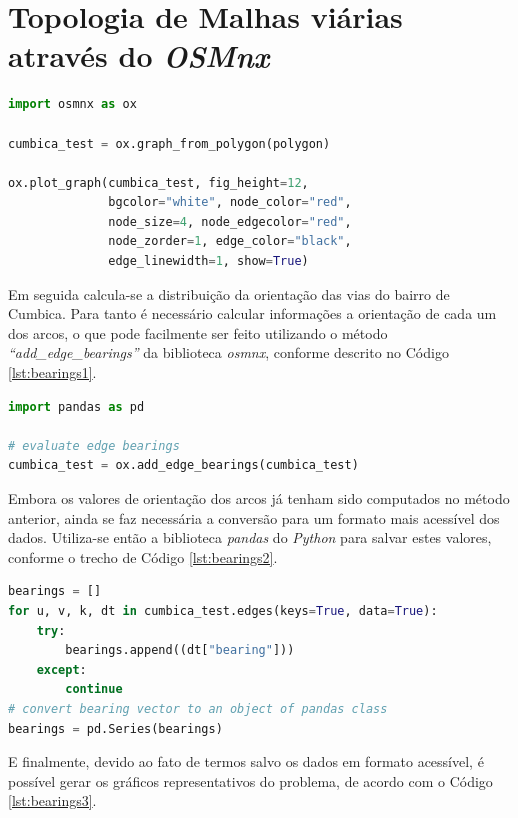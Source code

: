 \section{Topologia de Malhas viárias através do \textit{OSMnx}}

\begin{lstlisting}[language=Python, label={lst:import_ox},caption= \small Visualizando a malha de Cumbica com a biblioteca \textit{osmnx} \normalsize]
import osmnx as ox

cumbica_test = ox.graph_from_polygon(polygon)

ox.plot_graph(cumbica_test, fig_height=12,
              bgcolor="white", node_color="red", 
              node_size=4, node_edgecolor="red", 
              node_zorder=1, edge_color="black", 
              edge_linewidth=1, show=True)
\end{lstlisting}

Em seguida calcula-se a distribuição da orientação das vias do bairro de Cumbica.
Para tanto é necessário calcular informações a orientação de cada um dos arcos, o que pode facilmente ser feito utilizando o método \textit{``add\_edge\_bearings''} da biblioteca \textit{osmnx}, conforme descrito no Código \ref{lst:bearings1}.

\begin{lstlisting}[language=Python, label={lst:bearings1}, caption= \small Calculando orientação das vias (arcos) \normalsize]
import pandas as pd

# evaluate edge bearings
cumbica_test = ox.add_edge_bearings(cumbica_test)
\end{lstlisting}

Embora os valores de orientação dos arcos já tenham sido computados no método anterior, ainda se faz necessária a conversão para um formato mais acessível dos dados. 
Utiliza-se então a biblioteca \textit{pandas} do \textit{Python} para salvar estes valores, conforme o trecho de Código \ref{lst:bearings2}.

\begin{lstlisting}[language=Python, label={lst:bearings2}, caption= \small Convertendo resultado para objeto da classe \textit{Pandas} \normalsize]
bearings = []
for u, v, k, dt in cumbica_test.edges(keys=True, data=True):
    try: 
        bearings.append((dt["bearing"]))
    except:
        continue
# convert bearing vector to an object of pandas class
bearings = pd.Series(bearings)
\end{lstlisting}

E finalmente, devido ao fato de termos salvo os dados em formato acessível, é possível gerar os gráficos representativos do problema, de acordo com o Código \ref{lst:bearings3}. 

